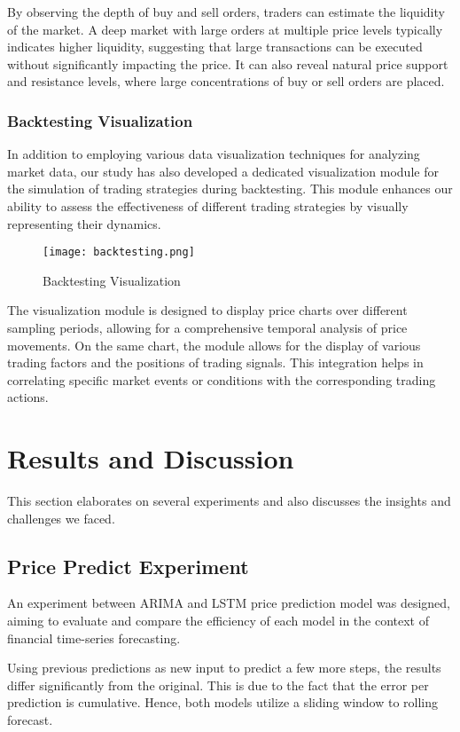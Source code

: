\documentclass[conference]{IEEEtran}
\begin{document}
 By observing the depth of buy and sell orders, traders can estimate the liquidity of the market. A deep market with large orders at multiple price levels typically indicates higher liquidity, suggesting that large transactions can be executed without significantly impacting the price. It can also reveal natural price support and resistance levels, where large concentrations of buy or sell orders are placed.


\subsubsection{Backtesting Visualization}

In addition to employing various data visualization techniques for analyzing market data, our study has also developed a dedicated visualization module for the simulation of trading strategies during backtesting. This module enhances our ability to assess the effectiveness of different trading strategies by visually representing their dynamics.
\begin{figure*}[tb]
    \centerline{\texttt{[image: backtesting.png]}}
    \caption{Backtesting Visualization}
    \label{backtesting}
\end{figure*}

The visualization module is designed to display price charts over different sampling periods, allowing for a comprehensive temporal analysis of price movements. On the same chart, the module allows for the display of various trading factors and the positions of trading signals. This integration helps in correlating specific market events or conditions with the corresponding trading actions.


\section{Results and Discussion} \label{section4}

This section elaborates on several experiments and also discusses the insights and challenges we faced.
\subsection{Price Predict Experiment}
An experiment between ARIMA and LSTM price prediction model was designed, aiming to evaluate and compare the efficiency of each model in the context of financial time-series forecasting.

Using previous predictions as new input to predict a few more steps, the results differ significantly from the original. This is due to the fact that the error per prediction is cumulative. Hence, both models utilize a sliding window to rolling forecast.
\end{document}
